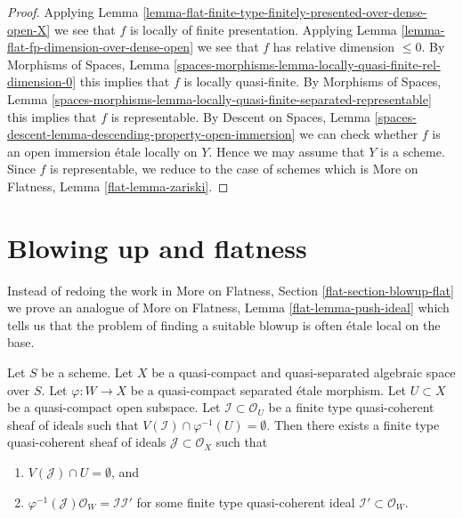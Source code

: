 \begin{proof}
Applying
Lemma \ref{lemma-flat-finite-type-finitely-presented-over-dense-open-X}
we see that $f$ is locally of finite presentation. Applying
Lemma \ref{lemma-flat-fp-dimension-over-dense-open}
we see that $f$ has relative dimension $\leq 0$.
By Morphisms of Spaces, Lemma
\ref{spaces-morphisms-lemma-locally-quasi-finite-rel-dimension-0}
this implies that $f$ is locally quasi-finite.
By Morphisms of Spaces, Lemma
\ref{spaces-morphisms-lemma-locally-quasi-finite-separated-representable}
this implies that $f$ is representable.
By Descent on Spaces, Lemma
\ref{spaces-descent-lemma-descending-property-open-immersion}
we can check whether $f$ is an open immersion \'etale locally on $Y$.
Hence we may assume that $Y$ is a scheme. Since $f$ is representable,
we reduce to the case of schemes which is
More on Flatness, Lemma \ref{flat-lemma-zariski}.
\end{proof}







\section{Blowing up and flatness}
\label{section-blowup-flat}

\noindent
Instead of redoing the work in
More on Flatness, Section \ref{flat-section-blowup-flat}
we prove an analogue of More on Flatness, Lemma \ref{flat-lemma-push-ideal}
which tells us that the problem of finding a suitable blowup
is often \'etale local on the base.

\begin{lemma}
\label{lemma-push-ideal}
Let $S$ be a scheme. Let $X$ be a quasi-compact and quasi-separated
algebraic space over $S$. Let $\varphi : W \to X$ be a quasi-compact
separated \'etale morphism. Let $U \subset X$ be a quasi-compact open
subspace. Let $\mathcal{I} \subset \mathcal{O}_U$ be a finite type
quasi-coherent sheaf of ideals such that
$V(\mathcal{I}) \cap \varphi^{-1}(U) = \emptyset$.
Then there exists a finite type quasi-coherent sheaf of ideals
$\mathcal{J} \subset \mathcal{O}_X$ such that
\begin{enumerate}
\item $V(\mathcal{J}) \cap U = \emptyset$, and
\item $\varphi^{-1}(\mathcal{J})\mathcal{O}_W = \mathcal{I} \mathcal{I}'$
for some finite type quasi-coherent ideal
$\mathcal{I}' \subset \mathcal{O}_W$.
\end{enumerate}
\end{lemma}

